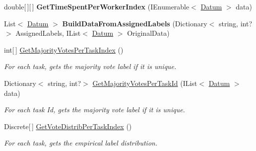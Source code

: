\begin{DoxyCompactItemize}
\item 
\hypertarget{class_crowdsourcing_models_1_1_data_mapping_a93a884e4f60d956db1722e80ad3aeda2}{}double\mbox{[}$\,$\mbox{]}\mbox{[}$\,$\mbox{]} {\bfseries Get\+Time\+Spent\+Per\+Worker\+Index} (I\+Enumerable$<$ \hyperlink{class_crowdsourcing_models_1_1_datum}{Datum} $>$ data)\label{class_crowdsourcing_models_1_1_data_mapping_a93a884e4f60d956db1722e80ad3aeda2}

\item 
\hypertarget{class_crowdsourcing_models_1_1_data_mapping_a582a48c6dc7221ec0bdc6c2391fb63bb}{}List$<$ \hyperlink{class_crowdsourcing_models_1_1_datum}{Datum} $>$ {\bfseries Build\+Data\+From\+Assigned\+Labels} (Dictionary$<$ string, int?$>$ Assigned\+Labels, I\+List$<$ \hyperlink{class_crowdsourcing_models_1_1_datum}{Datum} $>$ Original\+Data)\label{class_crowdsourcing_models_1_1_data_mapping_a582a48c6dc7221ec0bdc6c2391fb63bb}

\item 
int\mbox{[}$\,$\mbox{]} \hyperlink{class_crowdsourcing_models_1_1_data_mapping_ae49f5c10a3ffd67112c3db12a2d55d2b}{Get\+Majority\+Votes\+Per\+Task\+Index} ()
\begin{DoxyCompactList}\small\item\em For each task, gets the majority vote label if it is unique. \end{DoxyCompactList}\item 
Dictionary$<$ string, int?$>$ \hyperlink{class_crowdsourcing_models_1_1_data_mapping_a1b49a16d4857e3c1903a4848c6b5086c}{Get\+Majority\+Votes\+Per\+Task\+Id} (I\+List$<$ \hyperlink{class_crowdsourcing_models_1_1_datum}{Datum} $>$ data)
\begin{DoxyCompactList}\small\item\em For each task Id, gets the majority vote label if it is unique. \end{DoxyCompactList}\item 
Discrete\mbox{[}$\,$\mbox{]} \hyperlink{class_crowdsourcing_models_1_1_data_mapping_a0b92226017087d546271ed10bb017528}{Get\+Vote\+Distrib\+Per\+Task\+Index} ()
\begin{DoxyCompactList}\small\item\em For each task, gets the empirical label distribution. \end{DoxyCompactList}\end{DoxyCompactItemize}
